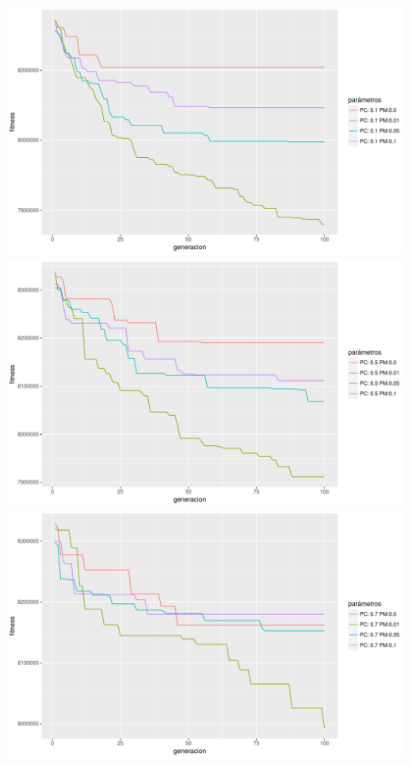 \documentclass[10pt,a4paper]{article}
\begin{document}
\includegraphics[width = \textwidth]{img/graphics/GAgenericPC01.pdf}
\includegraphics[width = \textwidth]{img/graphics/GAgenericPC05.pdf}
\includegraphics[width = \textwidth]{img/graphics/GAgenericPC07.pdf}
\end{document}

